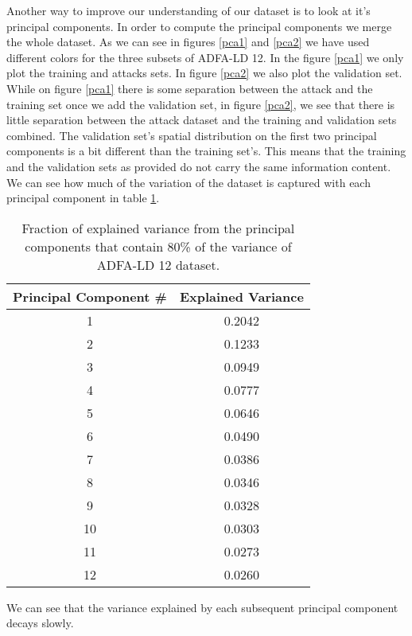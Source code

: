 \documentclass[reqno,openany,12pt]{amsbook}
\begin{document}
Another way to improve our understanding of our dataset is to look at it's principal components. In order to compute the principal components we merge the whole dataset. As we can see in figures \ref{pca1} and \ref{pca2} we have used different colors for the three subsets of ADFA-LD 12. In the figure \ref{pca1} we only plot the training and attacks sets. In figure \ref{pca2} we also plot the validation set. While on figure \ref{pca1} there is some separation between the attack and the training set once we add the validation set, in figure \ref{pca2}, we see that there is little separation between the attack dataset and the training and validation sets combined. The validation set's spatial distribution on the first two principal components is a bit different than the training set's.
This means 
that the training and the validation sets as provided do not carry the same information content. We can see how much of the variation of the dataset is captured with each principal component in table \ref{pcat1}.
\begin{table}
\begin{tabular}{|c|c|}
\hline
Principal Component \# &  Explained Variance \\ \hline 
1  & 0.2042 \\ \hline
2  & 0.1233 \\ \hline
3  & 0.0949 \\ \hline
4  & 0.0777 \\ \hline
5  & 0.0646 \\ \hline
6  & 0.0490 \\ \hline
7  & 0.0386 \\ \hline
8  & 0.0346 \\ \hline
9  & 0.0328 \\ \hline
10 & 0.0303 \\ \hline
11 & 0.0273 \\ \hline
12 & 0.0260 \\ \hline
\end{tabular}
\vspace{5pt}
\caption{Fraction of explained variance from the principal components that contain 80\% of the variance of ADFA-LD 12 dataset.}
\label{pcat1}
\end{table}
We can see that the variance explained by each subsequent principal component decays slowly.
\end{document}
